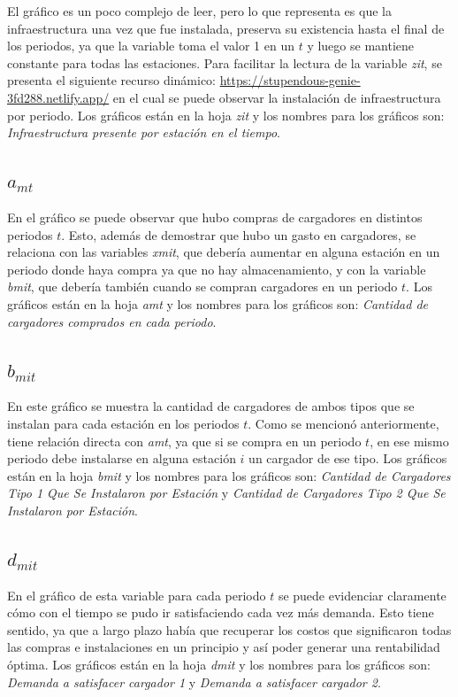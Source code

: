\documentclass[letterpaper]{article}
\begin{document}
\begin{flushleft}
	El gráfico es un poco complejo de leer, pero lo que representa es que la infraestructura una vez que fue instalada, preserva su existencia hasta el final de los periodos, ya que la variable toma el valor 1 en un $t$ y luego se mantiene constante para todas las estaciones. Para facilitar la lectura de la variable \textit{zit}, se presenta el siguiente recurso dinámico: \url{https://stupendous-genie-3fd288.netlify.app/} en el cual se puede observar la instalación de infraestructura por periodo. Los gráficos están en la hoja \textit{zit} y los nombres para los gráficos son: \textit{Infraestructura presente por estación en el tiempo}.

	\subsection{$a_{mt}$} \label{sec:amt}

	En el gráfico se puede observar que hubo compras de cargadores en distintos periodos $t$. Esto, además de demostrar que hubo un gasto en cargadores, se relaciona con las variables \textit{xmit}, que debería aumentar en alguna estación en un periodo donde haya compra ya que no hay almacenamiento, y con la variable \textit{bmit}, que debería también cuando se compran cargadores en un periodo $t$. Los gráficos están en la hoja \textit{amt} y los nombres para los gráficos son: \textit{Cantidad de cargadores comprados en cada periodo}.

	\subsection{$b_{mit}$}

	En este gráfico se muestra la cantidad de cargadores de ambos tipos que se instalan para cada estación en los periodos $t$. Como se mencionó anteriormente, tiene relación directa con \textit{amt}, ya que si se compra en un periodo $t$, en ese mismo periodo debe instalarse en alguna estación $i$ un cargador de ese tipo. Los gráficos están en la hoja \textit{bmit} y los nombres para los gráficos son: \textit{Cantidad de Cargadores Tipo 1 Que Se Instalaron por Estación} y \textit{Cantidad de Cargadores Tipo 2 Que Se Instalaron por Estación}.

	\subsection{$d_{mit}$}

	En el gráfico de esta variable para cada periodo $t$ se puede evidenciar claramente cómo con el tiempo se pudo ir satisfaciendo cada vez más demanda. Esto tiene sentido, ya que a largo plazo había que recuperar los costos que significaron todas las compras e instalaciones en un principio y así poder generar una rentabilidad óptima. Los gráficos están en la hoja \textit{dmit} y los nombres para los gráficos son: \textit{Demanda a satisfacer cargador 1} y \textit{Demanda a satisfacer cargador 2}.


\end{flushleft}
\end{document}
